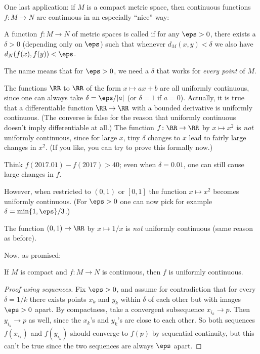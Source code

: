 One last application: if $M$ is a compact metric space,
then continuous functions $f \colon M \to N$
are continuous in an especially ``nice'' way:
\begin{definition}
	A function $f \colon M \to N$ of metric spaces
	is called 
	if for any $\eps > 0$, there exists a $\delta > 0$
	(depending only on $\eps$) such that
	whenever $d_M(x,y) < \delta$ we also have $d_N(f(x), f(y)) < \eps$.
\end{definition}
The name means that for $\eps > 0$,
we need a $\delta$ that works for \emph{every point} of $M$.
\begin{example}
	\listhack
	\begin{enumerate}[(a)]
		\ii The functions $\RR$ to $\RR$ of the form
		$x \mapsto ax+b$ are all uniformly continuous,
		since one can always take $\delta = \eps/|a|$ (or $\delta=1$ if $a=0$).
		\ii Actually, it is true that a differentiable function $\RR \to \RR$
		with a bounded derivative is uniformly continuous.
		(The converse is false for the reason that uniformly continuous
		doesn't imply differentiable at all.)
		\ii The function $f \colon \RR \to \RR$ by $x \mapsto x^2$
		is \emph{not} uniformly continuous, since for large $x$,
		tiny $\delta$ changes to $x$ lead to fairly large changes in $x^2$.
		(If you like, you can try to prove this formally now.)

		Think $f(2017.01) - f(2017) > 40$;
		even when $\delta = 0.01$, one can still cause large changes in $f$.

		\ii However, when restricted to $(0,1)$ or $[0,1]$
		the function $x \mapsto x^2$ becomes uniformly continuous.
		(For $\eps > 0$ one can now pick for example $\delta = \min\{1,\eps\}/3$.)

		\ii The function $(0,1) \to \RR$ by $x \mapsto 1/x$ is \emph{not}
		uniformly continuous (same reason as before).
	\end{enumerate}
\end{example}

Now, as promised:
\begin{proposition}
	If $M$ is compact and $f \colon M \to N$ is continuous,
	then $f$ is uniformly continuous.
\end{proposition}
\begin{proof}[Proof using sequences]
	Fix $\eps > 0$, and assume for contradiction that for every $\delta = 1/k$
	there exists points $x_k$ and $y_k$ within $\delta$ of each
	other but with images $\eps > 0$ apart.
	By compactness, take a convergent subsequence $x_{i_k} \to p$.
	Then $y_{i_k} \to p$ as well, since the $x_k$'s and $y_k$'s are close to each other.
	So both sequences $f(x_{i_k})$ and $f(y_{i_k})$ should converge to $f(p)$ by sequential continuity,
	but this can't be true since the two sequences are always $\eps$ apart.
\end{proof}

